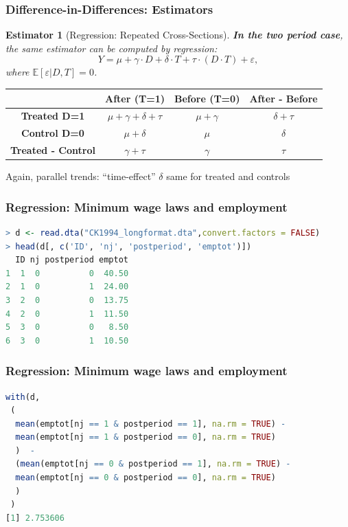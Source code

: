 \documentclass[xcolor=dvipsnames]{beamer}
\newcommand\E{\mathbb{E}}
\newtheorem{esti}{Estimator}
\begin{document}
\begin{frame}
  \frametitle{Difference-in-Differences: Estimators}
\begin{esti}[Regression: Repeated Cross-Sections]\small
\textbf{In the two period case}, the same estimator can be computed by regression:
\[
Y = \mu + \gamma\cdot D + \delta\cdot T + \tau \cdot (D\cdot T) + \varepsilon,
\]
where $\E[\varepsilon|D,T]=0$.
\end{esti}\medskip
{}
\begin{center}
\small
\begin{tabular}{c|c|c|c}

    {\bf } & {\bf After (T=1)} & {\bf Before (T=0)} & {\bf After - Before} \\
\hline \hline
\multirow{2}{*}{{\bf Treated D=1}}  & \multirow{2}{*}{$\mu + \gamma + \delta + \tau$} & \multirow{2}{*}{$\mu + \gamma$} & \multirow{2}{*}{$\delta + \tau$}    \\
 & & & \\
\hline
\multirow{2}{*}{{\bf Control D=0}}   & \multirow{2}{*}{$\mu +  \delta$} & \multirow{2}{*}{$\mu$} & \multirow{2}{*}{$\delta$}    \\
 & & & \\
\hline
\multirow{2}{*}{{\bf Treated - Control}}   & \multirow{2}{*}{$\gamma + \tau$} & \multirow{2}{*}{$\gamma$} & \multirow{2}{*}{$\tau$}    \\
 & & & \\
\hline
\end{tabular}
\end{center}
\small
Again, parallel trends: ``time-effect'' $\delta$ same for treated and controls
\end{frame}

\begin{frame}[fragile]
  \frametitle{Regression: Minimum wage laws and employment}

\scriptsize
\begin{lstlisting}[language=R, basicstyle=\ttfamily]
> d <- read.dta("CK1994_longformat.dta",convert.factors = FALSE)
> head(d[, c('ID', 'nj', 'postperiod', 'emptot')])
  ID nj postperiod emptot
1  1  0          0  40.50
2  1  0          1  24.00
3  2  0          0  13.75
4  2  0          1  11.50
5  3  0          0   8.50
6  3  0          1  10.50
\end{lstlisting}
\end{frame}

\begin{frame}[fragile]
  \frametitle{Regression: Minimum wage laws and employment}

\footnotesize
\begin{lstlisting}[language=R, basicstyle=\ttfamily]
with(d, 
 (
  mean(emptot[nj == 1 & postperiod == 1], na.rm = TRUE) - 
  mean(emptot[nj == 1 & postperiod == 0], na.rm = TRUE)
  )  - 
  (mean(emptot[nj == 0 & postperiod == 1], na.rm = TRUE) - 
  mean(emptot[nj == 0 & postperiod == 0], na.rm = TRUE)
  )
 )
[1] 2.753606
\end{lstlisting}
\end{frame}
\end{document}
